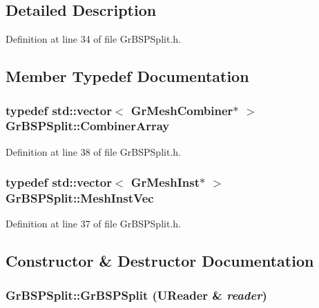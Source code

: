 \subsection{Detailed Description}


Definition at line 34 of file GrBSPSplit.h.

\subsection{Member Typedef Documentation}
\hypertarget{class_gr_b_s_p_split_c43b3da58545a4586d6a7a451f5935af}{
\subsubsection[{CombinerArray}]{\setlength{\rightskip}{0pt plus 5cm}typedef std::vector$<$ {\bf GrMeshCombiner}$\ast$ $>$ {\bf GrBSPSplit::CombinerArray}}}
\label{class_gr_b_s_p_split_c43b3da58545a4586d6a7a451f5935af}




Definition at line 38 of file GrBSPSplit.h.\hypertarget{class_gr_b_s_p_split_0d83e2da4ca339cbb2bb2060b2bec99b}{
\subsubsection[{MeshInstVec}]{\setlength{\rightskip}{0pt plus 5cm}typedef std::vector$<$ {\bf GrMeshInst}$\ast$ $>$ {\bf GrBSPSplit::MeshInstVec}}}
\label{class_gr_b_s_p_split_0d83e2da4ca339cbb2bb2060b2bec99b}




Definition at line 37 of file GrBSPSplit.h.

\subsection{Constructor \& Destructor Documentation}
\hypertarget{class_gr_b_s_p_split_40e7d5a265ecb02482fed589590c9e9f}{
\subsubsection[{GrBSPSplit}]{\setlength{\rightskip}{0pt plus 5cm}GrBSPSplit::GrBSPSplit ({\bf UReader} \& {\em reader})}}
\label{class_gr_b_s_p_split_40e7d5a265ecb02482fed589590c9e9f}




